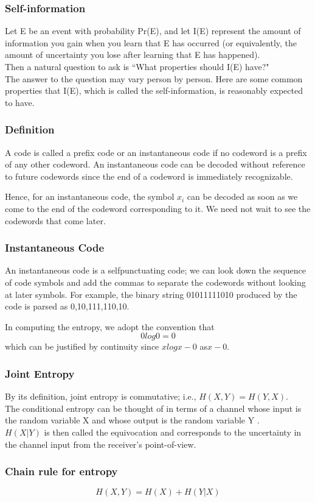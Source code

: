 \documentclass[a4]{beamer}
\begin{document}
\begin{frame}
\frametitle{Self-information}

Let E be an event with probability Pr(E), and let I(E) represent the amount
of information you gain when you learn that E has occurred (or equivalently,
the amount of uncertainty you lose after learning that E has happened). \\Then
a natural question to ask is ``What properties should I(E) have?" 
\\
The answer
to the question may vary person by person. Here are some common properties
that I(E), which is called the self-information, is reasonably expected to have.

\end{frame}
\begin{frame}
\frametitle{Definition} A code is called a prefix code or an instantaneous code if
no codeword is a prefix of any other codeword.
An instantaneous code can be decoded without reference to future codewords
since the end of a codeword is immediately recognizable. 

Hence,
for an instantaneous code, the symbol $x_i$ can be decoded as soon as we
come to the end of the codeword corresponding to it. We need not wait
to see the codewords that come later. 
\end{frame}
\begin{frame}
\frametitle{Instantaneous Code}
An instantaneous code is a selfpunctuating
code; we can look down the sequence of code symbols and
add the commas to separate the codewords without looking at later symbols.
For example, the binary string 01011111010 produced by the code
is parsed as 0,10,111,110,10.
\end{frame}
\begin{frame}
In computing the entropy, we adopt the convention that
\[0  log 0 = 0\]
which can be justified by continuity since $x log x - 0$ as$ x - 0$.

\end{frame}
\begin{frame}
\frametitle{Joint Entropy}
By its definition, joint entropy is commutative; i.e., $H(X,Y ) = H(Y,X)$.
\\
The conditional entropy can be thought of in terms of a channel whose input
is the random variable X and whose output is the random variable Y . \\

$H(X|Y )$ is
then called the equivocation and corresponds to the uncertainty in the channel
input from the receiver's point-of-view.
\end{frame}
\begin{frame}
\frametitle{Chain rule for entropy}
\[H(X, Y ) = H(X) + H(Y |X)\]
\end{frame}
\end{document}
